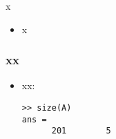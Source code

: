 \documentclass[10pt,hyperref]{beamer}
\begin{document}
\begin{frame}{x}

\begin{itemize}
\item x
\end{itemize}
\end{frame}


\begin{frame}[fragile]
\frametitle{xx}

\begin{itemize}
\item xx:

\medskip
\begin{Verbatim}[fontsize=\scriptsize]
>> size(A)
ans =
      201        5
\end{Verbatim}

\end{itemize}
\end{frame}
\end{document}
